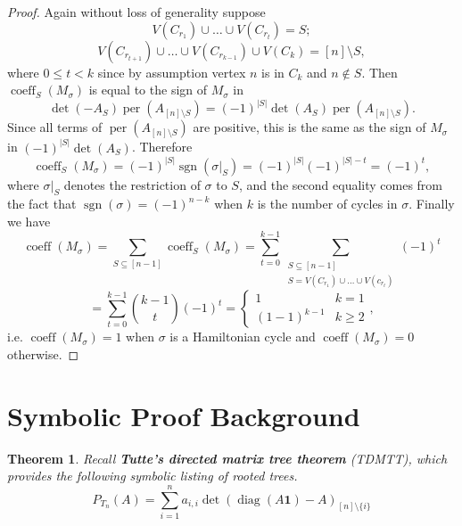 \documentclass{article}
\newcommand{\diag}{\operatorname{diag}}
\newcommand{\per}{\operatorname{per}}
\newcommand{\coeff}{\operatorname{coeff}}
\newcommand{\sgn}{\operatorname{sgn}}
\theoremstyle{theorem}
\newtheorem{thm}{Theorem}
\theoremstyle{definition}
\begin{document}
\begin{proof}
    Again without loss of generality suppose
    \[
        V(C_{r_1})\cup\hdots\cup V(C_{r_t})=S;
    \]
    \[
        V(C_{r_{t+1}})\cup\hdots\cup V(C_{r_{k-1}})\cup V(C_{k})=[n]\setminus S,
    \]
    where $0\leq t<k$ since by assumption vertex $n$ is in $C_k$ and $n\not\in S$. Then $\coeff_S(M_\sigma)$ is equal to the sign of $M_\sigma$ in
    \[
        \det(-A_S)\per(A_{[n]\setminus S})=(-1)^{|S|}\det(A_S)\per(A_{[n]\setminus S}).
    \]
    Since all terms of $\per(A_{[n]\setminus S})$ are positive, this is the same as the sign of $M_\sigma$ in $(-1)^{|S|}\det(A_S)$.
    Therefore
    \[
        \coeff_S(M_\sigma)=(-1)^{|S|}\sgn(\sigma|_S)=(-1)^{|S|}(-1)^{|S|-t}=(-1)^t,
    \]
    where $\sigma|_{S}$ denotes the restriction of $\sigma$ to $S$, and the second equality comes from the fact that $\sgn(\sigma)=(-1)^{n-k}$ when $k$ is the number of cycles in $\sigma$. Finally we have
    \[
        \coeff(M_\sigma)=\sum_{S\subseteq[n-1]}\coeff_S(M_\sigma)=\sum_{t=0}^{k-1}\sum_{
        \substack{
            S\subseteq[n-1] \\
            S=V(C_{r_1})\cup\hdots\cup V(c_{r_t})
        }
        }
        (-1)^t
    \]
    \[
        =\sum_{t=0}^{k-1}{k-1\choose t}(-1)^t=
        \begin{cases}
            1 & k=1 \\
            (1-1)^{k-1} & k\geq 2
        \end{cases},
    \]
    i.e. $\coeff(M_\sigma)=1$ when $\sigma$ is a Hamiltonian cycle and $\coeff(M_\sigma)=0$ otherwise.
    
\end{proof}

\section{Symbolic Proof Background}\label{s:background}

\begin{thm}
    Recall \textbf{Tutte's directed matrix tree theorem} (TDMTT), which provides the following symbolic listing of rooted trees.
    \[
        P_{T_n}(A) = \sum_{i=1}^na_{i,i}\det\left(\diag(A\boldsymbol{1})-A\right)_{[n]\setminus\{i\}}
    \]
\end{thm}
\end{document}
